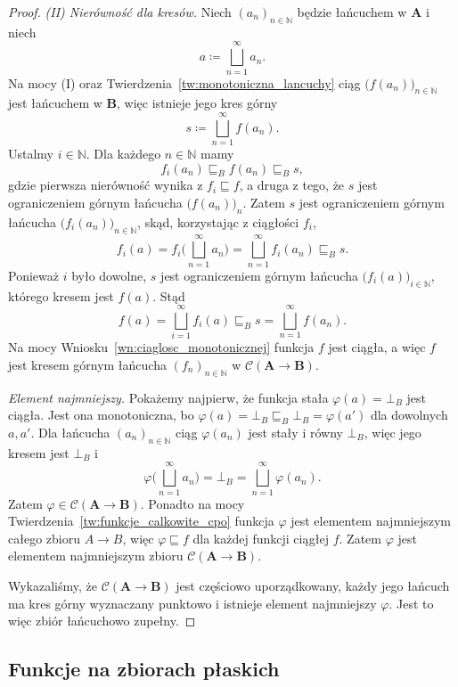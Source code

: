 \documentclass[11pt,a4paper]{article}
\theoremstyle{definition}
\theoremstyle{plain}
\newcommand{\bt}{\bot}                            %
\begin{document}
\begin{proof}
	\emph{(II) Nierówność dla kresów.} Niech $(a_n)_{n\in\mathbb N}$ będzie
	łańcuchem w $\boldsymbol{A}$ i niech
	\[
	a\coloneqq \bigsqcup_{n=1}^{\infty}a_n.
	\]
	Na mocy (I) oraz Twierdzenia~\ref{tw:monotoniczna_lancuchy} ciąg
	$\big(f(a_n)\big)_{n\in\mathbb N}$ jest łańcuchem w $\boldsymbol{B}$,
	więc istnieje jego kres górny
	\[
	s\coloneqq \bigsqcup_{n=1}^{\infty}f(a_n).
	\]
	Ustalmy $i\in\mathbb N$. Dla każdego $n\in\mathbb N$ mamy
	\[
	f_i(a_n)\sqsubseteq_B f(a_n)\sqsubseteq_B s,
	\]
	gdzie pierwsza nierówność wynika z $f_i\sqsubseteq f$, a druga z tego,
	że $s$ jest ograniczeniem górnym łańcucha $\big(f(a_n)\big)_n$.
	Zatem $s$ jest ograniczeniem górnym łańcucha
	$\big(f_i(a_n)\big)_{n\in\mathbb N}$, skąd, korzystając z ciągłości
	$f_i$,
	\[
	f_i(a)
	=
	f_i\Big(\bigsqcup_{n=1}^{\infty}a_n\Big)
	=
	\bigsqcup_{n=1}^{\infty}f_i(a_n)
	\sqsubseteq_B
	s.
	\]
	Ponieważ $i$ było dowolne, $s$ jest ograniczeniem górnym łańcucha
	$\big(f_i(a)\big)_{i\in\mathbb N}$, którego kresem jest $f(a)$. Stąd
	\[
	f(a)
	=
	\bigsqcup_{i=1}^{\infty}f_i(a)
	\sqsubseteq_B
	s
	=
	\bigsqcup_{n=1}^{\infty}f(a_n).
	\]
	Na mocy Wniosku~\ref{wn:ciaglosc_monotonicznej} funkcja $f$ jest
	ciągła, a więc $f$ jest kresem górnym łańcucha
	$(f_n)_{n\in\mathbb N}$ w $\mathcal{C}(\boldsymbol{A}\to\boldsymbol{B})$.
	
	\emph{Element najmniejszy.} Pokażemy najpierw, że funkcja stała
	$\varphi(a)=\bt_B$ jest ciągła. Jest ona monotoniczna, bo
	$\varphi(a)=\bt_B\sqsubseteq_B\bt_B=\varphi(a')$ dla dowolnych $a,a'$.
	Dla łańcucha $(a_n)_{n\in\mathbb N}$ ciąg $\varphi(a_n)$ jest stały
	i równy $\bt_B$, więc jego kresem jest $\bt_B$ i
	\[
	\varphi\Big(\bigsqcup_{n=1}^{\infty}a_n\Big)
	=
	\bt_B
	=
	\bigsqcup_{n=1}^{\infty}\varphi(a_n).
	\]
	Zatem $\varphi\in\mathcal{C}(\boldsymbol{A}\to\boldsymbol{B})$.
	Ponadto na mocy Twierdzenia~\ref{tw:funkcje_calkowite_cpo} funkcja
	$\varphi$ jest elementem najmniejszym całego zbioru $A\to B$, więc
	$\varphi\sqsubseteq f$ dla każdej funkcji ciągłej $f$. Zatem $\varphi$
	jest elementem najmniejszym zbioru
	$\mathcal{C}(\boldsymbol{A}\to\boldsymbol{B})$.
	
	Wykazaliśmy, że $\mathcal{C}(\boldsymbol{A}\to\boldsymbol{B})$ jest
	częściowo uporządkowany, każdy jego łańcuch ma kres górny wyznaczany
	punktowo i istnieje element najmniejszy $\varphi$. Jest to więc zbiór
	łańcuchowo zupełny.
\end{proof}

\subsection{Funkcje na zbiorach płaskich}
\end{document}
